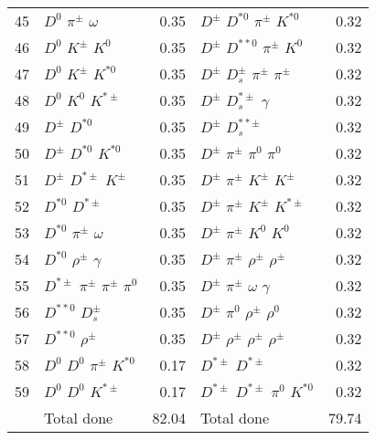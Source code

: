 \documentclass[6pt]{article}
\begin{document}
\begin{tabular}{rlr|lr}
45 & $D^0$ $\pi^{\pm}$ $\omega$ & 0.35 & $D^{\pm}$ $D^{*0}$ $\pi^{\pm}$ $K^{*0}$ & 0.32 \\
46 & $D^0$ $K^{\pm}$ $K^0$ & 0.35 & $D^{\pm}$ $D^{**0}$ $\pi^{\pm}$ $K^0$ & 0.32 \\
47 & $D^0$ $K^{\pm}$ $K^{*0}$ & 0.35 & $D^{\pm}$ $D_s^{\pm}$ $\pi^{\pm}$ $\pi^{\pm}$ & 0.32 \\
48 & $D^0$ $K^0$ $K^{*\pm}$ & 0.35 & $D^{\pm}$ $D_s^{*\pm}$ $\gamma$ & 0.32 \\
49 & $D^{\pm}$ $D^{*0}$ & 0.35 & $D^{\pm}$ $D_s^{**\pm}$ & 0.32 \\
50 & $D^{\pm}$ $D^{*0}$ $K^{*0}$ & 0.35 & $D^{\pm}$ $\pi^{\pm}$ $\pi^0$ $\pi^0$ & 0.32 \\
51 & $D^{\pm}$ $D^{*\pm}$ $K^{\pm}$ & 0.35 & $D^{\pm}$ $\pi^{\pm}$ $K^{\pm}$ $K^{\pm}$ & 0.32 \\
52 & $D^{*0}$ $D^{*\pm}$ & 0.35 & $D^{\pm}$ $\pi^{\pm}$ $K^{\pm}$ $K^{*\pm}$ & 0.32 \\
53 & $D^{*0}$ $\pi^{\pm}$ $\omega$ & 0.35 & $D^{\pm}$ $\pi^{\pm}$ $K^0$ $K^0$ & 0.32 \\
54 & $D^{*0}$ $\rho^{\pm}$ $\gamma$ & 0.35 & $D^{\pm}$ $\pi^{\pm}$ $\rho^{\pm}$ $\rho^{\pm}$ & 0.32 \\
55 & $D^{*\pm}$ $\pi^{\pm}$ $\pi^{\pm}$ $\pi^0$ & 0.35 & $D^{\pm}$ $\pi^{\pm}$ $\omega$ $\gamma$ & 0.32 \\
56 & $D^{**0}$ $D_s^{\pm}$ & 0.35 & $D^{\pm}$ $\pi^0$ $\rho^{\pm}$ $\rho^0$ & 0.32 \\
57 & $D^{**0}$ $\rho^{\pm}$ & 0.35 & $D^{\pm}$ $\rho^{\pm}$ $\rho^{\pm}$ $\rho^{\pm}$ & 0.32 \\
58 & $D^0$ $D^0$ $\pi^{\pm}$ $K^{*0}$ & 0.17 & $D^{*\pm}$ $D^{*\pm}$ & 0.32 \\
59 & $D^0$ $D^0$ $K^{*\pm}$ & 0.17 & $D^{*\pm}$ $D^{*\pm}$ $\pi^0$ $K^{*0}$ & 0.32 \\
\hline & Total done & 82.04 & Total done & 79.74\\
\end{tabular}
\end{document}
